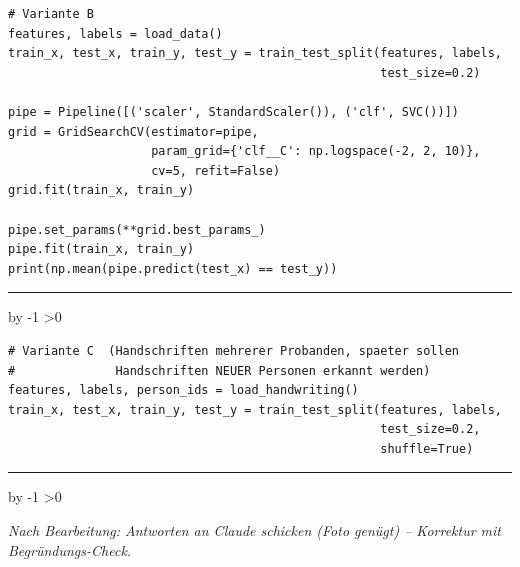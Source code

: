 \documentclass[10pt,a4paper]{article}
\newcommand{\antwortlinien}[1]{%
  \par\vspace{2pt}%
  \newcount\zeilen \zeilen=#1
  \loop
    \noindent\rule{\linewidth}{0.4pt}\par\vspace{11pt}%
    \advance\zeilen by -1
  \ifnum\zeilen>0 \repeat
}
\begin{document}
\Needspace*{7cm}
\begin{lstlisting}
# Variante B
features, labels = load_data()
train_x, test_x, train_y, test_y = train_test_split(features, labels,
                                                    test_size=0.2)

pipe = Pipeline([('scaler', StandardScaler()), ('clf', SVC())])
grid = GridSearchCV(estimator=pipe,
                    param_grid={'clf__C': np.logspace(-2, 2, 10)},
                    cv=5, refit=False)
grid.fit(train_x, train_y)

pipe.set_params(**grid.best_params_)
pipe.fit(train_x, train_y)
print(np.mean(pipe.predict(test_x) == test_y))
\end{lstlisting}
\antwortlinien{3}

\Needspace*{6cm}
\begin{lstlisting}
# Variante C  (Handschriften mehrerer Probanden, spaeter sollen
#              Handschriften NEUER Personen erkannt werden)
features, labels, person_ids = load_handwriting()
train_x, test_x, train_y, test_y = train_test_split(features, labels,
                                                    test_size=0.2,
                                                    shuffle=True)
\end{lstlisting}
\antwortlinien{3}

\vspace{10pt}
\begin{center}
\footnotesize\itshape
Nach Bearbeitung: Antworten an Claude schicken (Foto genügt) -- Korrektur mit Begründungs-Check.
\end{center}
\end{document}
